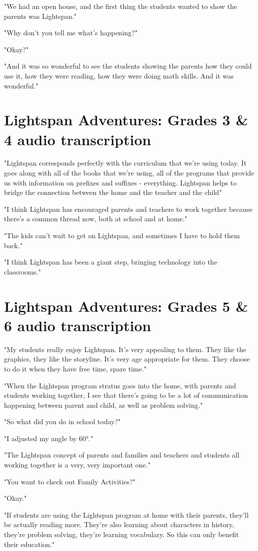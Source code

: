"We had an open house, and the first thing the students wanted to show the parents was Lightspan."

"Why don't you tell me what's happening?"

"Okay?"

"And it was so wonderful to see the students showing the parents how they could use it, how they were reading, how they were doing math skills.
And it was wonderful."

\section{Lightspan Adventures: Grades 3 \& 4 audio transcription}

"Lightspan corresponds perfectly with the curriculum that we're using today.
It goes along with all of the books that we're using, all of the programs that provide us with information on prefixes and suffixes - everything.
Lightspan helps to bridge the connection between the home and the teacher and the child"

"I think Lightspan has encouraged parents and teachers to work together because there's a common thread now, both at school and at home."

"The kids can't wait to get on Lightspan, and sometimes I have to hold them back."

"I think Lightspan has been a giant step, bringing technology into the classrooms."

\section{Lightspan Adventures: Grades 5 \& 6 audio transcription}

"My students really enjoy Lightspan.
It's very appealing to them.
They like the graphics, they like the storyline.
It's very age appropriate for them.
They choose to do it when they have free time, spare time."

"When the Lightspan program stratus goes into the home, with parents and students working together, I see that there's going to be a lot of communication happening between parent and child, as well as problem solving."

"So what did you do in school today?"

"I adjusted my angle by 60°."

"The Lightspan concept of parents and families and teachers and students all working together is a very, very important one."

"You want to check out Family Activities?"

"Okay."

"If students are using the Lightspan program at home with their parents, they'll be actually reading more.
They're also learning about characters in history, they're problem solving, they're learning vocabulary.
So this can only benefit their education."